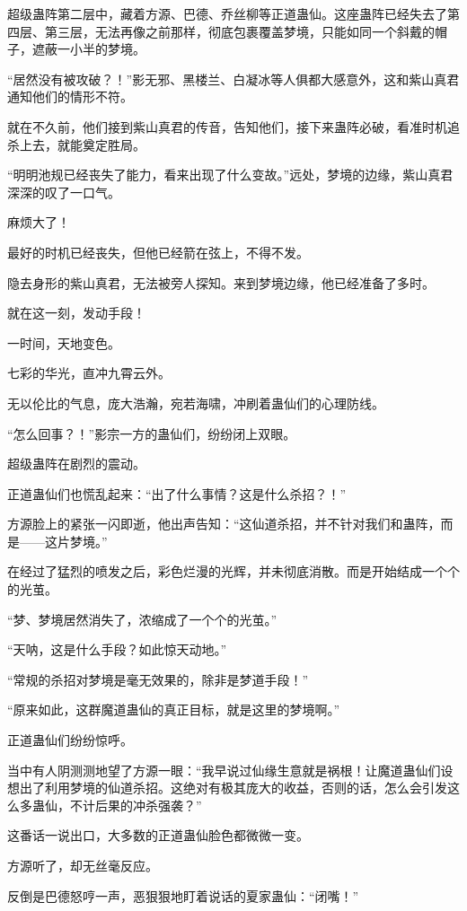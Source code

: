 \begin{this_body}
超级蛊阵第二层中，藏着方源、巴德、乔丝柳等正道蛊仙。这座蛊阵已经失去了第四层、第三层，无法再像之前那样，彻底包裹覆盖梦境，只能如同一个斜戴的帽子，遮蔽一小半的梦境。

“居然没有被攻破？！”影无邪、黑楼兰、白凝冰等人俱都大感意外，这和紫山真君通知他们的情形不符。

就在不久前，他们接到紫山真君的传音，告知他们，接下来蛊阵必破，看准时机追杀上去，就能奠定胜局。

“明明池规已经丧失了能力，看来出现了什么变故。”远处，梦境的边缘，紫山真君深深的叹了一口气。

麻烦大了！

最好的时机已经丧失，但他已经箭在弦上，不得不发。

隐去身形的紫山真君，无法被旁人探知。来到梦境边缘，他已经准备了多时。

就在这一刻，发动手段！

一时间，天地变色。

七彩的华光，直冲九霄云外。

无以伦比的气息，庞大浩瀚，宛若海啸，冲刷着蛊仙们的心理防线。

“怎么回事？！”影宗一方的蛊仙们，纷纷闭上双眼。

超级蛊阵在剧烈的震动。

正道蛊仙们也慌乱起来：“出了什么事情？这是什么杀招？！”

方源脸上的紧张一闪即逝，他出声告知：“这仙道杀招，并不针对我们和蛊阵，而是——这片梦境。”

在经过了猛烈的喷发之后，彩色烂漫的光辉，并未彻底消散。而是开始结成一个个的光茧。

“梦、梦境居然消失了，浓缩成了一个个的光茧。”

“天呐，这是什么手段？如此惊天动地。”

“常规的杀招对梦境是毫无效果的，除非是梦道手段！”

“原来如此，这群魔道蛊仙的真正目标，就是这里的梦境啊。”

正道蛊仙们纷纷惊呼。

当中有人阴测测地望了方源一眼：“我早说过仙缘生意就是祸根！让魔道蛊仙们设想出了利用梦境的仙道杀招。这绝对有极其庞大的收益，否则的话，怎么会引发这么多蛊仙，不计后果的冲杀强袭？”

这番话一说出口，大多数的正道蛊仙脸色都微微一变。

方源听了，却无丝毫反应。

反倒是巴德怒哼一声，恶狠狠地盯着说话的夏家蛊仙：“闭嘴！”


\end{this_body}
